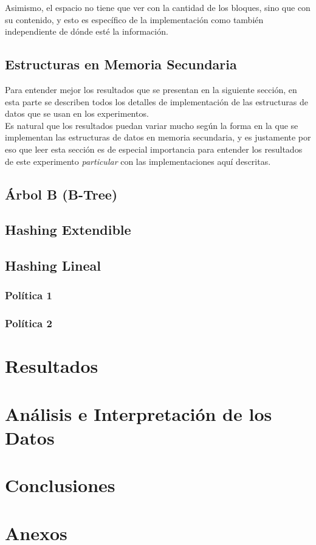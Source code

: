 \documentclass[12pt,letterpaper]{report}
\begin{document}
Asimismo, el espacio no tiene que ver con la cantidad de los bloques, sino que con su contenido, y esto es específico de la implementación como también independiente de dónde esté la información.


\subsection{Estructuras en Memoria Secundaria}

Para entender mejor los resultados que se presentan en la siguiente sección, en esta parte se describen todos los detalles de implementación de las estructuras de datos que se usan en los experimentos.\\

Es natural que los resultados puedan variar mucho según la forma en la que se implementan las estructuras de datos en memoria secundaria, y es justamente por eso que leer esta sección es de especial importancia para entender los resultados de este experimento \emph{particular} con las implementaciones aquí descritas.

\subsection{Árbol B (B-Tree)}

\subsection{Hashing Extendible}
\subsection{Hashing Lineal}
\subsubsection{Política 1}
\subsubsection{Política 2}

\newpage
\section{Resultados}


\newpage
\section{Análisis e Interpretación de los Datos}

\newpage
\section{Conclusiones}

\newpage
\section{Anexos}
\end{document}
